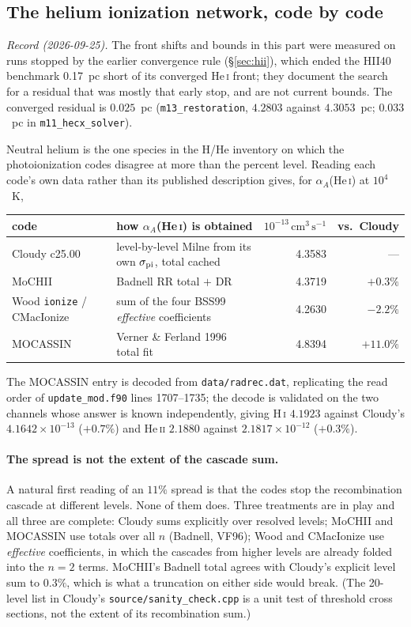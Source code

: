\documentclass[english,a4paper]{my_memo}
\newcommand{\code}[1]{\texttt{#1}}
\newcommand{\cmc}{\mathrm{cm^{3}\,s^{-1}}}
\begin{document}
\subsection{The helium ionization network, code by code}
\label{sec:henetwork}
\emph{Record (2026-09-25).}  The front shifts and bounds in this part were
measured on runs stopped by the earlier convergence rule (\S\ref{sec:hii}),
which ended the HII40 benchmark 0.17~pc short of its converged He\,\textsc{i}
front; they document the search for a residual that was mostly that early
stop, and are not current bounds.  The converged residual is $0.025$~pc
(\code{m13\_restoration}, $4.2803$ against $4.3053$~pc; $0.033$~pc in
\code{m11\_hecx\_solver}).

Neutral helium is the one species in the H/He inventory on which the
photoionization codes disagree at more than the percent level.  Reading
each code's own data rather than its published description gives, for
$\alpha_A$(He\,\textsc{i}) at $10^4$~K,
\begin{center}\small
\begin{tabular}{@{}llrr@{}}
\toprule
code & how $\alpha_A$(He\,\textsc{i}) is obtained
     & $10^{-13}\,\cmc$ & vs.\ Cloudy \\
\midrule
Cloudy c25.00 & level-by-level Milne from its own $\sigma_{\rm pi}$,
                total cached & 4.3583 & --- \\
MoCHII        & Badnell RR total $+$ DR & 4.3719 & $+0.3\%$ \\
Wood \code{ionize} / CMacIonize
              & sum of the four BSS99 \emph{effective} coefficients
              & 4.2630 & $-2.2\%$ \\
MOCASSIN      & Verner \& Ferland 1996 total fit & 4.8394 & $+11.0\%$ \\
\bottomrule
\end{tabular}
\end{center}
The MOCASSIN entry is decoded from \code{data/radrec.dat}, replicating the
read order of \code{update\_mod.f90} lines 1707--1735; the decode is
validated on the two channels whose answer is known independently, giving
H\,\textsc{i} $4.1923$ against Cloudy's $4.1642{\times}10^{-13}$ ($+0.7\%$)
and He\,\textsc{ii} $2.1880$ against $2.1817{\times}10^{-12}$ ($+0.3\%$).

\paragraph{The spread is not the extent of the cascade sum.}  A natural
first reading of an $11\%$ spread is that the codes stop the recombination
cascade at different levels.  None of them does.  Three treatments are in
play and all three are complete: Cloudy sums explicitly over resolved
levels; MoCHII and MOCASSIN use totals over all $n$ (Badnell, VF96); Wood
and CMacIonize use \emph{effective} coefficients, in which the cascades
from higher levels are already folded into the $n = 2$ terms.  MoCHII's
Badnell total agrees with Cloudy's explicit level sum to $0.3\%$, which is
what a truncation on either side would break.  (The 20-level list in
Cloudy's \code{source/sanity\_check.cpp} is a unit test of threshold cross
sections, not the extent of its recombination sum.)
\end{document}
